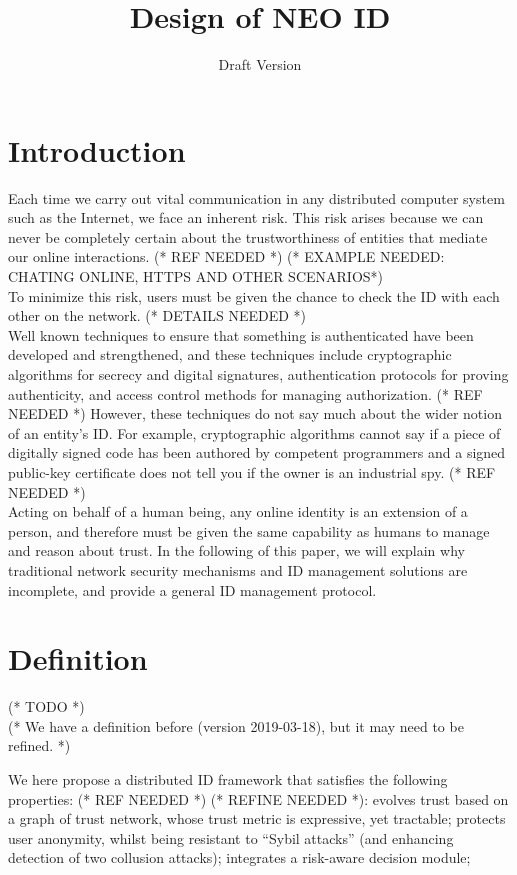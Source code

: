 \documentclass{article}
\begin{document}
\title{Design of NEO ID}
\author{Draft Version}
\date{}
\maketitle


\section{Introduction}

Each time we carry out vital communication in any distributed computer system such as the Internet, we face an inherent risk. This risk arises because
we can never be completely certain about the trustworthiness of entities that mediate our online interactions. (* REF NEEDED *) (* EXAMPLE NEEDED:
CHATING ONLINE, HTTPS AND OTHER SCENARIOS*)\\
To minimize this risk, users must be given the chance to check the ID with each other on the network. (* DETAILS NEEDED *)\\
Well known techniques to ensure that something is authenticated have been developed and strengthened, and these techniques include cryptographic
algorithms for secrecy and digital signatures, authentication protocols for proving authenticity, and access control methods for managing authorization.
(* REF NEEDED *) However, these techniques do not say much about the wider notion of an entity{'}s ID. For example, cryptographic algorithms cannot
say if a piece of digitally signed code has been authored by competent programmers and a signed public-key certificate does not tell you if the owner
is an industrial spy. (* REF NEEDED *)\\
Acting on behalf of a human being, any online identity is an extension of a person, and therefore must be given the same capability as humans to
manage and reason about trust. In the following of this paper, we will explain why traditional network security mechanisms and ID management solutions
are incomplete, and provide a general ID management protocol.


\section{Definition}

(* TODO *)\\
(* We have a definition before (version 2019-03-18), but it may need to be refined. *)

We here propose a distributed ID framework that satisfies the following properties: (* REF NEEDED *) (* REFINE NEEDED *): evolves trust based on
a graph of trust network, whose trust metric is expressive, yet tractable; protects user anonymity, whilst being resistant to {``}Sybil attacks{''}
(and enhancing detection of two collusion attacks); integrates a risk-aware decision module;
\end{document}

